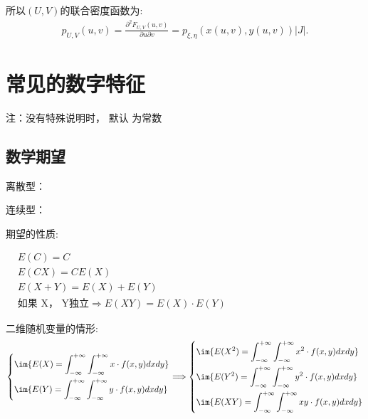 所以$(U, V)$的联合密度函数为:
\begin{align*}
p_{\scriptscriptstyle U, V}(u, v)=\frac{\partial^{2} F_{U, V}(u, v)}{\partial u \partial v}=p_{\xi, \eta}(x(u, v), y(u, v))|J| .
\end{align*}


\section{常见的数字特征}
注：没有特殊说明时， 默认 为常数 
\subsection{数学期望}

离散型： 

连续型：  

期望的性质:

\hspace*{5em}
$\begin{aligned}
    & {E(C)=C} \\
    & E(CX) = CE(X)\\
    & E(X+Y) = E(X) + E(Y)\\
    & \mbox{如果 X， Y独立} \Rightarrow E(XY) = E(X)\cdot E(Y) 
\end{aligned}
$

二维随机变量的情形:
\begin{align}
    \left\{
    \begin{aligned}
        &\im{E(X) = \int_{-\infty}^{+\infty}{\int_{-\infty}^{+\infty}{x\cdot f(x,y) dx} dy}}\\
        &\im{E(Y) = \int_{-\infty}^{+\infty}{\int_{-\infty}^{+\infty}{y\cdot f(x,y) dx} dy}}    
    \end{aligned}
    \right.
    \Longrightarrow
    \left\{
    \begin{aligned}
        & \im{E(X^2) = \int_{-\infty}^{+\infty}{\int_{-\infty}^{+\infty}{x^2\cdot f(x,y) dx} dy}}\\
        & \im{E(Y^2) = \int_{-\infty}^{+\infty}{\int_{-\infty}^{+\infty}{y^2\cdot f(x,y) dx} dy}}\\
        & \im{E(XY) = \int_{-\infty}^{+\infty}{\int_{-\infty}^{+\infty}{xy\cdot f(x,y) dx} dy}}
    \end{aligned}
    \right.
    \notag
\end{align}

